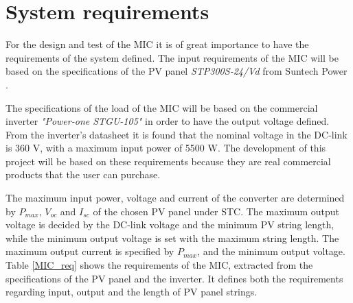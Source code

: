 \section{System requirements} \label{systemreq}

For the design and test of the MIC it is of great importance to have the requirements of the system defined. The input requirements of the MIC will be based on the specifications of the PV panel \textit{STP300S-24/Vd} from Suntech Power \cite{PV_panel}. 


The specifications of the load of the MIC will be based on the commercial inverter \textit{"Power-one STGU-105"} \cite{power_one_inverter} in order to have the output voltage defined. From the inverter's datasheet it is found that the nominal voltage in the DC-link is 360 V, with a maximum input power of 5500 W. The development of this project will be based on these requirements because they are real commercial products that the user can purchase. 

The maximum input power, voltage and current of the converter are determined by $P_{max}$, $V_{oc}$ and $I_{sc}$ of the chosen PV panel under STC. The maximum output voltage is decided by the DC-link voltage and the minimum PV string length, while the minimum output voltage is set with the maximum string length. The maximum output current is specified by $P_{max}$, and the minimum output voltage. Table \ref{MIC_req} shows the requirements of the MIC, extracted from the specifications of the PV panel and the inverter. It defines both the requirements regarding input, output and the length of PV panel strings. 

